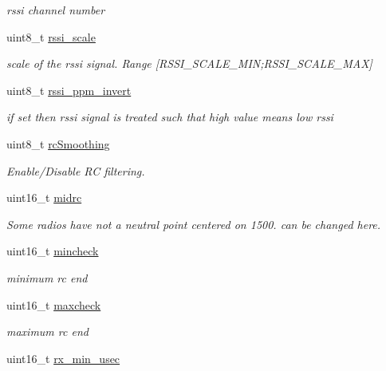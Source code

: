 \begin{DoxyCompactItemize}
\begin{DoxyCompactList}\small\item\em rssi channel number \end{DoxyCompactList}\item 
uint8\+\_\+t \hyperlink{structrxConfig__s_a4fdbbefbcf43fac6691a866f2a662c75}{rssi\+\_\+scale}
\begin{DoxyCompactList}\small\item\em scale of the rssi signal. Range \mbox{[}R\+S\+S\+I\+\_\+\+S\+C\+A\+L\+E\+\_\+\+M\+I\+N;R\+S\+S\+I\+\_\+\+S\+C\+A\+L\+E\+\_\+\+M\+A\+X\mbox{]} \end{DoxyCompactList}\item 
uint8\+\_\+t \hyperlink{structrxConfig__s_a09023842ed3aba63a004843434fa80b3}{rssi\+\_\+ppm\+\_\+invert}
\begin{DoxyCompactList}\small\item\em if set then rssi signal is treated such that high value means low rssi \end{DoxyCompactList}\item 
uint8\+\_\+t \hyperlink{structrxConfig__s_aada23b2a7dd616b0a4e8556e1e500d2e}{rc\+Smoothing}
\begin{DoxyCompactList}\small\item\em Enable/\+Disable R\+C filtering. \end{DoxyCompactList}\item 
uint16\+\_\+t \hyperlink{structrxConfig__s_a413e18afb030caffe6cead58c8736145}{midrc}
\begin{DoxyCompactList}\small\item\em Some radios have not a neutral point centered on 1500. can be changed here. \end{DoxyCompactList}\item 
uint16\+\_\+t \hyperlink{structrxConfig__s_a51f9850bb1f8dfcd25244b993474af0a}{mincheck}
\begin{DoxyCompactList}\small\item\em minimum rc end \end{DoxyCompactList}\item 
uint16\+\_\+t \hyperlink{structrxConfig__s_a46814cbc934d5b8d5270eeee26b586f2}{maxcheck}
\begin{DoxyCompactList}\small\item\em maximum rc end \end{DoxyCompactList}\item 
uint16\+\_\+t \hyperlink{structrxConfig__s_aec5d9c542b6b13e7780bdc6b51166e4a}{rx\+\_\+min\+\_\+usec}

\end{DoxyCompactItemize}
